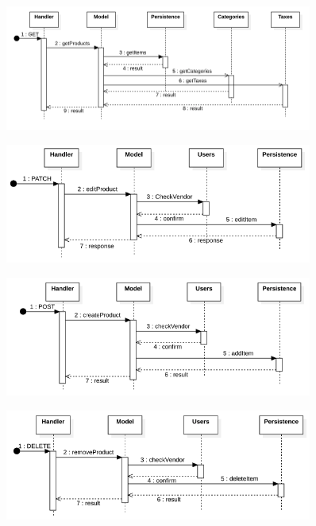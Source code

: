 \begin{figure}[H]
    \includegraphics[width=0.9\textwidth]{res/images/sequence-diagrams/products/getProducts.png}
\end{figure}

\begin{figure}[H]
    \includegraphics[width=0.9\textwidth]{res/images/sequence-diagrams/products/editProduct.png}
\end{figure}

\begin{figure}[H]
    \includegraphics[width=0.9\textwidth]{res/images/sequence-diagrams/products/createProduct.png}
\end{figure}

\begin{figure}[H]
    \includegraphics[width=0.9\textwidth]{res/images/sequence-diagrams/products/removeProduct.png}
\end{figure}


